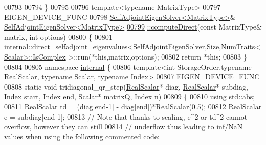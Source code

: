 \begin{DoxyCode}
00793 
00794 \}
00795 
00796 \textcolor{keyword}{template}<\textcolor{keyword}{typename} MatrixType>
00797 EIGEN\_DEVICE\_FUNC
00798 \hyperlink{group___eigenvalues___module_class_eigen_1_1_self_adjoint_eigen_solver}{SelfAdjointEigenSolver<MatrixType>}& 
      \hyperlink{group___eigenvalues___module_a40b0a68841d6176b1ab98743cc82bef4}{SelfAdjointEigenSolver<MatrixType>}
\hyperlink{group___eigenvalues___module_a40b0a68841d6176b1ab98743cc82bef4}{00799} \hyperlink{group___eigenvalues___module_a40b0a68841d6176b1ab98743cc82bef4}{::computeDirect}(\textcolor{keyword}{const} MatrixType& matrix, \textcolor{keywordtype}{int} options)
00800 \{
00801   
      \hyperlink{struct_eigen_1_1internal_1_1direct__selfadjoint__eigenvalues}{internal::direct\_selfadjoint\_eigenvalues<SelfAdjointEigenSolver,Size,NumTraits<Scalar>::IsComplex}
      >::run(*\textcolor{keyword}{this},matrix,options);
00802   \textcolor{keywordflow}{return} *\textcolor{keyword}{this};
00803 \}
00804 
00805 \textcolor{keyword}{namespace }\hyperlink{namespaceinternal}{internal} \{
00806 \textcolor{keyword}{template}<\textcolor{keywordtype}{int} StorageOrder,\textcolor{keyword}{typename} RealScalar, \textcolor{keyword}{typename} Scalar, \textcolor{keyword}{typename} Index>
00807 EIGEN\_DEVICE\_FUNC
00808 \textcolor{keyword}{static} \textcolor{keywordtype}{void} tridiagonal\_qr\_step(\hyperlink{group___eigenvalues___module_a5dae5f422a3c71060e6bd31332bf64fd}{RealScalar}* diag, \hyperlink{group___eigenvalues___module_a5dae5f422a3c71060e6bd31332bf64fd}{RealScalar}* subdiag, 
      \hyperlink{group___eigenvalues___module_a8a59ab7734b6eae2754fd78bc7c3a360}{Index} start, \hyperlink{group___eigenvalues___module_a8a59ab7734b6eae2754fd78bc7c3a360}{Index} end, \hyperlink{group___eigenvalues___module_a0bfcedf4245b6846007ca4f01e4feb1f}{Scalar}* matrixQ, \hyperlink{group___eigenvalues___module_a8a59ab7734b6eae2754fd78bc7c3a360}{Index} n)
00809 \{
00810   \textcolor{keyword}{using} std::abs;
00811   \hyperlink{group___eigenvalues___module_a5dae5f422a3c71060e6bd31332bf64fd}{RealScalar} td = (diag[end-1] - diag[end])*\hyperlink{group___eigenvalues___module_a5dae5f422a3c71060e6bd31332bf64fd}{RealScalar}(0.5);
00812   \hyperlink{group___eigenvalues___module_a5dae5f422a3c71060e6bd31332bf64fd}{RealScalar} e = subdiag[end-1];
00813   \textcolor{comment}{// Note that thanks to scaling, e^2 or td^2 cannot overflow, however they can still}
00814   \textcolor{comment}{// underflow thus leading to inf/NaN values when using the following commented code:}

\end{DoxyCode}
